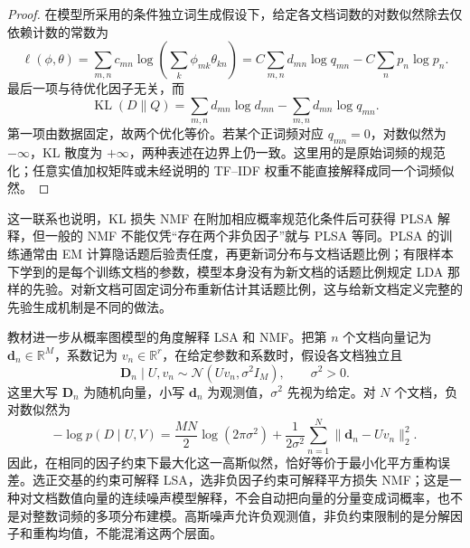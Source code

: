 \begin{proof}
在模型所采用的条件独立词生成假设下，给定各文档词数的对数似然除去仅依赖计数的常数为
\[
    \ell(\phi,\theta)
    =\sum_{m,n}c_{mn}\log\left(\sum_k\phi_{mk}\theta_{kn}\right)
    =C\sum_{m,n}d_{mn}\log q_{mn}
     -C\sum_n p_n\log p_n.
\]
最后一项与待优化因子无关，而
\[
    \operatorname{KL}(D\|Q)
    =\sum_{m,n}d_{mn}\log d_{mn}
     -\sum_{m,n}d_{mn}\log q_{mn}.
\]
第一项由数据固定，故两个优化等价。若某个正词频对应 $q_{mn}=0$，对数似然为 $-\infty$，KL 散度为 $+\infty$，两种表述在边界上仍一致。这里用的是原始词频的规范化；任意实值加权矩阵或未经说明的 TF--IDF 权重不能直接解释成同一个词频似然。
\end{proof}

这一联系也说明，KL 损失 NMF 在附加相应概率规范化条件后可获得 PLSA 解释，但一般的 NMF 不能仅凭“存在两个非负因子”就与 PLSA 等同。PLSA 的训练通常由 EM 计算隐话题后验责任度，再更新词分布与文档话题比例；有限样本下学到的是每个训练文档的参数，模型本身没有为新文档的话题比例规定 LDA 那样的先验。对新文档可固定词分布重新估计其话题比例，这与给新文档定义完整的先验生成机制是不同的做法。

教材进一步从概率图模型的角度解释 LSA 和 NMF。把第 $n$ 个文档向量记为 $\boldsymbol d_n\in\mathbb R^M$，系数记为 $v_n\in\mathbb R^r$，在给定参数和系数时，假设各文档独立且
\begin{equation}
\label{eq:lh-unsup-gaussian-factor-model}
    \boldsymbol D_n\mid U,v_n\sim\mathcal N(Uv_n,\sigma^2I_M),
    \qquad \sigma^2>0.
\end{equation}
这里大写 $\boldsymbol D_n$ 为随机向量，小写 $\boldsymbol d_n$ 为观测值，$\sigma^2$ 先视为给定。对 $N$ 个文档，负对数似然为
\[
    -\log p(D\mid U,V)
    =\frac{MN}{2}\log(2\pi\sigma^2)
     +\frac{1}{2\sigma^2}\sum_{n=1}^{N}\|\boldsymbol d_n-Uv_n\|_2^2.
\]
因此，在相同的因子约束下最大化这一高斯似然，恰好等价于最小化平方重构误差。选正交基的约束可解释 LSA，选非负因子约束可解释平方损失 NMF；这是一种对文档数值向量的连续噪声模型解释，不会自动把向量的分量变成词概率，也不是对整数词频的多项分布建模。高斯噪声允许负观测值，非负约束限制的是分解因子和重构均值，不能混淆这两个层面。

